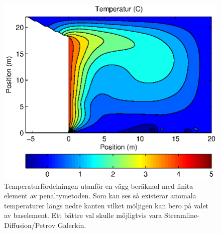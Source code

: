 \begin{figure}[hpbt]
\centering
\includegraphics{images/convectemperature.eps}
\caption{Temperaturfördelningen utanför en vägg beräknad med finita element av penaltymetoden. Som kan ses så existerar anomala temperaturer längs nedre kanten vilket
möljigen kan bero på valet av baselement. Ett bättre val skulle möjligtvis
vara Streamline-Diffusion/Petrov Galerkin.}
\end{figure}

